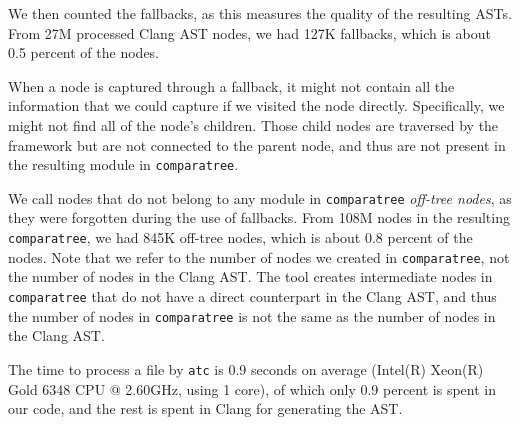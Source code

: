 We then counted the fallbacks, as this measures the quality of the resulting ASTs.
From 27M processed Clang AST nodes, we had 127K fallbacks, which is about 0.5 percent of the nodes.

When a node is captured through a fallback, it might not contain all the information that we could capture if we visited the node directly.
Specifically, we might not find all of the node's children.
Those child nodes are traversed by the framework but are not connected to the parent node, and thus are not present in the resulting module in \texttt{comparatree}.

We call nodes that do not belong to any module in \texttt{comparatree} \emph{off-tree nodes}, as they were forgotten during the use of fallbacks.
From 108M nodes in the resulting \texttt{comparatree}, we had 845K off-tree nodes, which is about 0.8 percent of the nodes.
Note that we refer to the number of nodes we created in \texttt{comparatree}, not the number of nodes in the Clang AST.
The tool creates intermediate nodes in \texttt{comparatree} that do not have a direct counterpart in the Clang AST, and thus the number of nodes in \texttt{comparatree} is not the same as the number of nodes in the Clang AST.

The time to process a file by \texttt{atc} is 0.9 seconds on average (Intel(R) Xeon(R) Gold 6348 CPU @ 2.60GHz, using 1 core), of which only 0.9 percent is spent in our code, and the rest is spent in Clang for generating the AST.
